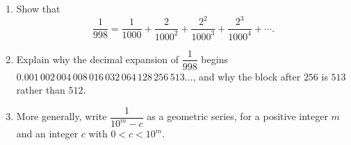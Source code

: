 \begin{enumerate}
\item[(a)] Show that
\[
\dfrac{1}{998}=\dfrac{1}{1000}+\dfrac{2}{1000^2}+\dfrac{2^2}{1000^3}+\dfrac{2^3}{1000^4}+\cdots .
\]
\item[(b)] Explain why the decimal expansion of $\dfrac{1}{998}$ begins $0.001\,002\,004\,008\,016\,032\,064\,128\,256\,513\ldots$, and why the block after $256$ is $513$ rather than $512$.
\item[(c)] More generally, write $\dfrac{1}{10^m-c}$ as a geometric series, for a positive integer $m$ and an integer $c$ with $0<c<10^m$.
\end{enumerate}
